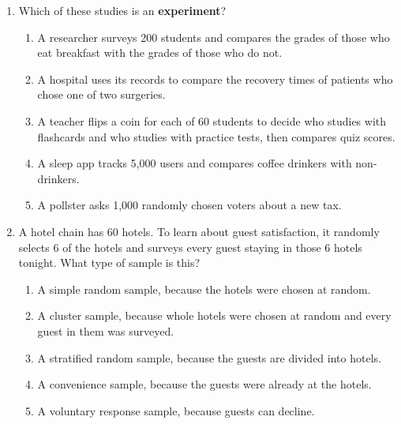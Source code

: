 \documentclass[12pt]{article}
\begin{document}
\begin{enumerate}[leftmargin=1.9em, itemsep=0.13in]
  \boxguard[14]
  \item Which of these studies is an \textbf{experiment}?
        \begin{enumerate}[label=\textbf{(\Alph*)}, leftmargin=2.2em, itemsep=2pt]
          \item A researcher surveys 200 students and compares the grades of those who eat
                breakfast with the grades of those who do not.
          \item A hospital uses its records to compare the recovery times of patients who chose
                one of two surgeries.
          \item A teacher flips a coin for each of 60 students to decide who studies with
                flashcards and who studies with practice tests, then compares quiz scores.
          \item A sleep app tracks 5{,}000 users and compares coffee drinkers with non-drinkers.
          \item A pollster asks 1{,}000 randomly chosen voters about a new tax.\hfill{}\rule[-0.2in]{0pt}{0.48in}
        \end{enumerate}

  \boxguard[13]
  \item A hotel chain has 60 hotels. To learn about guest satisfaction, it randomly selects 6
        of the hotels and surveys every guest staying in those 6 hotels tonight. What type of
        sample is this?
        \begin{enumerate}[label=\textbf{(\Alph*)}, leftmargin=2.2em, itemsep=2pt]
          \item A simple random sample, because the hotels were chosen at random.
          \item A cluster sample, because whole hotels were chosen at random and every guest
                in them was surveyed.
          \item A stratified random sample, because the guests are divided into hotels.
          \item A convenience sample, because the guests were already at the hotels.
          \item A voluntary response sample, because guests can decline.\hfill{}\rule[-0.2in]{0pt}{0.48in}
        \end{enumerate}


\end{enumerate}
\end{document}

